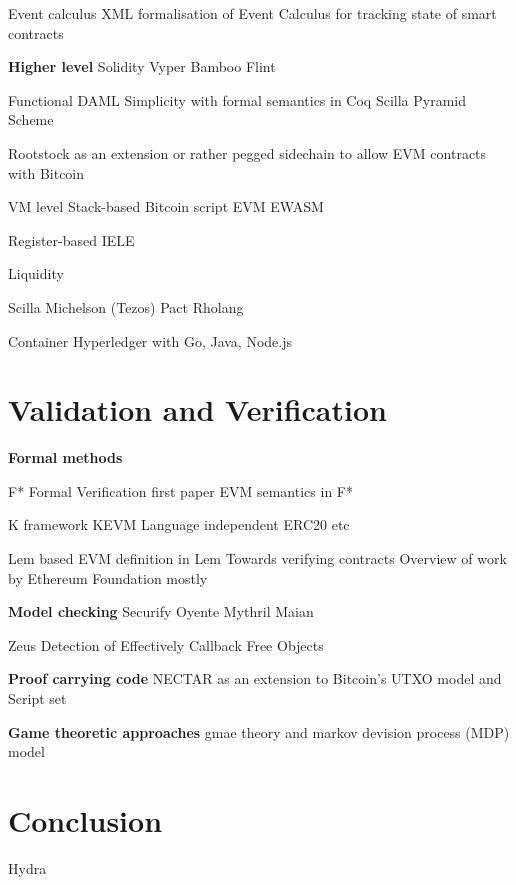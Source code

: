 \documentclass{article}
\begin{document}
Event calculus
XML formalisation of Event Calculus for tracking state of smart contracts \cite{Farrell2004}

\textbf{Higher level}
Solidity \cite{Ethereum2018Solidity}
Vyper \cite{Ethereum2018Vyper}
Bamboo \cite{Hirai2018Bamboo}
Flint \cite{Schrans2018}


Functional
DAML \cite{Shaul2018,Meier2018,Lippmeier2018,Huschenbett2018,Bernauer2018,Maric2018,Bleikertz2018,Lochbihler2018,Pilav2018}
Simplicity \cite{OConnor2017} with formal semantics in Coq
Scilla \cite{Sergey2018}
Pyramid Scheme \cite{Burge2018}

Rootstock as an extension or rather pegged sidechain to allow EVM contracts with Bitcoin \cite{Lerner2015}

VM level
Stack-based
Bitcoin script \cite{BitcoinWiki2018Script}
EVM \cite{Wood2014}
EWASM \cite{Wanderer2015,EthereumFoundation2018ewasm}

Register-based
IELE \cite{Kasampalis2018}


Liquidity \cite{OCamlProSAS2018}

Scilla \cite{Sergey2018}
Michelson (Tezos) \cite{DynamicLedgerSolutions2017}
Pact \cite{Popejoy2017}
Rholang \cite{Meredith2018}

Container
Hyperledger with Go, Java, Node.js \cite{Cachin2016}

\section{Validation and Verification}
\label{verification}
\textbf{Formal methods}

F*
Formal Verification first paper \cite{Bhargavan2016}
EVM semantics in F* \cite{Grishchenko2018}

K framework \cite{Rosu2007} 
KEVM \cite{Hildenbrandt2017}
Language independent \cite{Chen2018}
ERC20 etc \cite{Park2018}

Lem based \cite{Mulligan2014}
EVM definition in Lem \cite{Hirai2017}
Towards verifying contracts \cite{Amani2018}
Overview of work by Ethereum Foundation mostly \citeauthor{Hirai2018} \cite{Hirai2018}


\textbf{Model checking}
Securify \cite{Tsankov2017}
Oyente \cite{Luu2016}
Mythril \cite{Mueller2018}
Maian \cite{Nikolic2018}

Zeus \cite{Kalra2018}
Detection of Effectively Callback Free Objects \cite{Grossman2017}



\textbf{Proof carrying code}
NECTAR as an extension to Bitcoin's UTXO model and Script set \cite{Covaci2018}

\textbf{Game theoretic approaches}
gmae theory and markov devision process (MDP) model \cite{Bigi2015}



\section{Conclusion}
\label{conclusion}
Hydra \cite{Breidenbach2018}


\printbibliography
\end{document}
